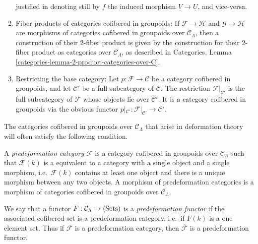 \begin{remarks}
\begin{enumerate}
justified in denoting still by $f$ the induced morphism $\underline{V} 
\rightarrow \underline{U}$, and vice-versa.
\item Fiber products of categories cofibered in groupoids: If $\mathcal F 
\rightarrow \mathcal H$ and $\mathcal G \rightarrow \mathcal H$ are morphisms 
of categories cofibered in groupoids over $\mathcal C_{\Lambda}$, then a 
construction of their 2-fiber product is given by the construction for their 
2-fiber product as categories over $\mathcal C_{\Lambda}$, as described in 
Categories, Lemma \ref{categories-lemma-2-product-categories-over-C}.
\item 
\label{item-definition-restricting-base-category}
Restricting the base category: Let $p : \mathcal F \rightarrow \mathcal C$ be a 
category cofibered in groupoids, and let $\mathcal C'$ be a full subcategory of 
$\mathcal C$.  The restriction $\mathcal F|_{\mathcal C'}$ is the full 
subcategory of $\mathcal F$ whose objects lie over $\mathcal C'$. It is a 
category cofibered in groupoids via the obvious functor $p|_{\mathcal C'}: 
\mathcal F|_{\mathcal C'} \rightarrow \mathcal C'$.
\end{enumerate}
\end{remarks}

\noindent
The categories cofibered in groupoids over $\mathcal C_{\Lambda}$ that arise in 
deformation theory will often satisfy the following condition.

\begin{definition}
\label{definition-predeformation-category}
A {\it predeformation category} $\mathcal F$ is a category cofibered in 
groupoids over $\mathcal C_{\Lambda}$ such that $\mathcal F(k)$ is a equivalent 
to a category with a single object and a single morphism, i.e.\ $\mathcal F(k)$ 
contains at least one object and there is a unique morphism between any two 
objects. A morphism of predeformation categories is a morphism of categories 
cofibered in groupoids over $\mathcal C_{\Lambda}$.
\end{definition}

\begin{remark}
\label{remark-predeformation-functor}
We say that a functor $F: \mathcal C_{\Lambda} \rightarrow \textnormal{(Sets)}$ 
is a {\it predeformation functor} if the associated cofibered set is a 
predeformation category, i.e.\ if $F(k)$ is a one element set.  Thus if 
$\mathcal F$ is a predeformation category, then $\overline{\mathcal F}$ is a 
predeformation functor.
\end{remark}

